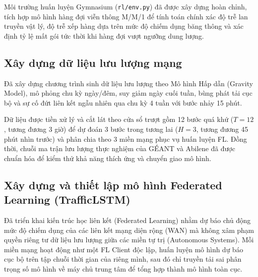 \documentclass[11pt,a4paper]{article}
\begin{document}
Môi trường huấn luyện Gymnasium (\texttt{rl/env.py}) đã được xây dựng hoàn chỉnh, tích hợp mô hình hàng đợi viễn thông M/M/1 để tính toán chính xác độ trễ lan truyền vật lý, độ trễ xếp hàng dựa trên mức độ chiếm dụng băng thông và xác định tỷ lệ mất gói tức thời khi hàng đợi vượt ngưỡng dung lượng.

\subsection{Xây dựng dữ liệu lưu lượng mạng}
Đã xây dựng chương trình sinh dữ liệu lưu lượng theo Mô hình Hấp dẫn (Gravity Model), mô phỏng chu kỳ ngày/đêm, suy giảm ngày cuối tuần, bùng phát tải cục bộ và sự cố đứt liên kết ngẫu nhiên qua chu kỳ 4 tuần với bước nhảy 15 phút.

Dữ liệu được tiền xử lý và cắt lát theo cửa sổ trượt gồm 12 bước quá khứ ($T=12$, tương đương 3 giờ) để dự đoán 3 bước trong tương lai ($H=3$, tương đương 45 phút nhìn trước) và phân chia theo 3 miền mạng phục vụ huấn luyện FL. Đồng thời, chuỗi ma trận lưu lượng thực nghiệm của GÉANT và Abilene đã được chuẩn hóa để kiểm thử khả năng thích ứng và chuyển giao mô hình.

\subsection{Xây dựng và thiết lập mô hình Federated Learning (TrafficLSTM)}
Đã triển khai kiến trúc học liên kết (Federated Learning) nhằm dự báo chủ động mức độ chiếm dụng của các liên kết mạng diện rộng (WAN) mà không xâm phạm quyền riêng tư dữ liệu lưu lượng giữa các miền tự trị (Autonomous Systems). Mỗi miền mạng hoạt động như một FL Client độc lập, huấn luyện mô hình dự báo cục bộ trên tập chuỗi thời gian của riêng mình, sau đó chỉ truyền tải sai phân trọng số mô hình về máy chủ trung tâm để tổng hợp thành mô hình toàn cục.
\end{document}
